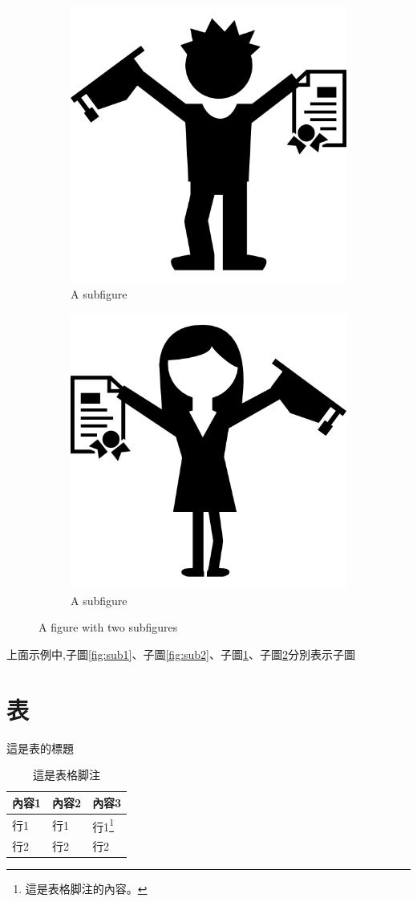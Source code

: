 \documentclass[
    writingLanguage=chinese,
    addPageTitle=on,
    addDeclaration=on,
    addMUSTlog=off,
    printing=off,
    refIndent=on,
    addFigTOC=on,
    addTabTOC=on,
]{.def/must}
\begin{document}
\begin{figure}[H]
	\begin{subfigure}{.49\textwidth}
		\centering
		\includegraphics[width=.5\linewidth]{.def/.resource/eg05.png}
		\caption{A subfigure}
		\label{fig:sub3}
	\end{subfigure}
	\begin{subfigure}{.49\textwidth}
		\centering
		\includegraphics[width=.5\linewidth]{.def/.resource/eg06.png}
		\caption{A subfigure}
		\label{fig:sub4}
	\end{subfigure}
	\caption{A figure with two subfigures}
	\label{fig:sub}
\end{figure}
 
上面示例中,子圖\ref{fig:sub1}、子圖\ref{fig:sub2}、子圖\ref{fig:sub3}、子圖\ref{fig:sub4}分別表示子圖



\section{表}

\captionsetup[table]{singlelinecheck=off,justification=raggedright}
\begin{table}
\caption{這是表的標題}
\centering
\begin{tabularx}{\textwidth}{XXX} %
\toprule
內容1 & 內容2 & 內容3 \\
\midrule
行1 & 行1 & 行1\footnote{這是表格脚注的內容。} \\
行2 & 行2 & 行2 \\
\bottomrule
\end{tabularx}
\caption*{這是表格脚注}
\end{table}
\end{document}
